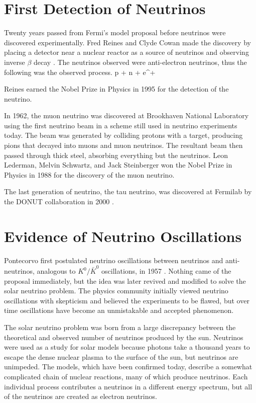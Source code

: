 \section{First Detection of Neutrinos}
\label{sec:1stDetection}

Twenty years passed from Fermi's model proposal before neutrinos were discovered experimentally. Fred Reines and Clyde Cowan made the discovery by placing a detector near a nuclear reactor as a source of neutrinos and observing inverse $\beta$ decay \cite{ref:1953, ref:1956}. The neutrinos observed were anti-electron neutrinos, thus the following was the observed process.
\beq
p + \anue \rightarrow n + e^{+}
\label{eq:BetaInv}
\eeq

\n Reines earned the Nobel Prize in Physics in 1995 for the detection of the neutrino.

In 1962, the muon neutrino was discovered at Brookhaven National Laboratory using the first neutrino beam \cite{ref:BNL} in a scheme still used in neutrino experiments today. The beam was generated by colliding protons with a target, producing pions that decayed into muons and muon neutrinos. The resultant beam then passed through thick steel, absorbing everything but the neutrinos. Leon Lederman, Melvin Schwartz, and Jack Steinberger won the Nobel Prize in Physics in 1988 for the discovery of the muon neutrino.

The last generation of neutrino, the tau neutrino, was discovered at Fermilab by the DONUT collaboration in 2000 \cite{ref:DONUT}.

\section{Evidence of Neutrino Oscillations}
\label{sec:OscHist}

Pontecorvo first postulated neutrino oscillations between neutrinos and anti-neutrinos, analogous to $K^0/\bar{K}^0$ oscillations, in 1957 \cite{ref:Pontecorvo1}. Nothing came of the proposal immediately, but the idea was later revived and modified to solve the solar neutrino problem. The physics community initially viewed neutrino oscillations with skepticism and believed the experiments to be flawed, but over time oscillations have become an unmistakable and accepted phenomenon.

The solar neutrino problem was born from a large discrepancy between the theoretical and observed number of neutrinos produced by the sun. Neutrinos were used as a study for solar models because photons take a thousand years to escape the dense nuclear plasma to the surface of the sun, but neutrinos are unimpeded. The models, which have been confirmed today, describe a somewhat complicated chain of nuclear reactions, many of which produce neutrinos. Each individual process contributes a neutrinos in a different energy spectrum, but all of the neutrinos are created as electron neutrinos.

